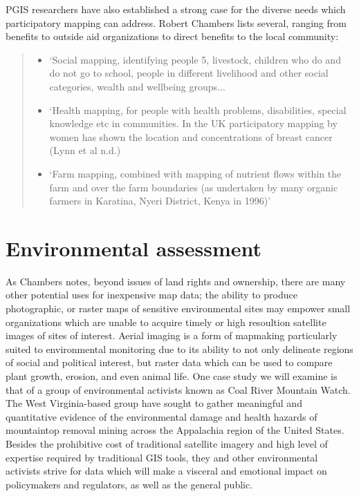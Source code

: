 \documentclass[11pt,oneside,notitlepage]{report}
\begin{document}
\ac{PGIS} researchers have also established a strong case for the diverse needs which participatory mapping can address. Robert Chambers lists several, ranging from benefits to outside aid organizations to direct benefits to the local community:

\begin{quote}
\begin{itemize}
	\item{`Social mapping, identifying people 5, livestock, children who do and do not go to school, people in different livelihood and other social categories, wealth and wellbeing groups...}
	\item{`Health mapping, for people with health problems, disabilities, special knowledge etc in communities. In the UK participatory mapping by women has shown the location and concentrations of breast cancer (Lynn et al n.d.)}
	\item{`Farm mapping, combined with mapping of nutrient flows within the farm and over the farm boundaries (as undertaken by many organic farmers in Karatina, Nyeri District, Kenya in 1996)'}
\end{itemize}
\cite{chambers2006whose}
\end{quote}

\section{Environmental assessment}

As Chambers notes, beyond issues of land rights and ownership, there are many other potential uses for inexpensive map data; the ability to produce photographic, or raster maps of sensitive environmental sites may empower small organizations which are unable to acquire timely or high resoultion satellite images of sites of interest. Aerial imaging is a form of mapmaking particularly suited to environmental monitoring due to its ability to not only delineate regions of social and political interest, but raster data which can be used to compare plant growth, erosion, and even animal life. One case study we will examine is that of a group of environmental activists known as Coal River Mountain Watch. The West Virginia-based group have sought to gather meaningful and quantitative evidence of the environmental damage and health hazards of mountaintop removal mining across the Appalachia region of the United States. Besides the prohibitive cost of traditional satellite imagery and high level of expertise required by traditional GIS tools, they and other environmental activists strive for data which will make a visceral and emotional impact on policymakers and regulators, as well as the general public. 
\end{document}

